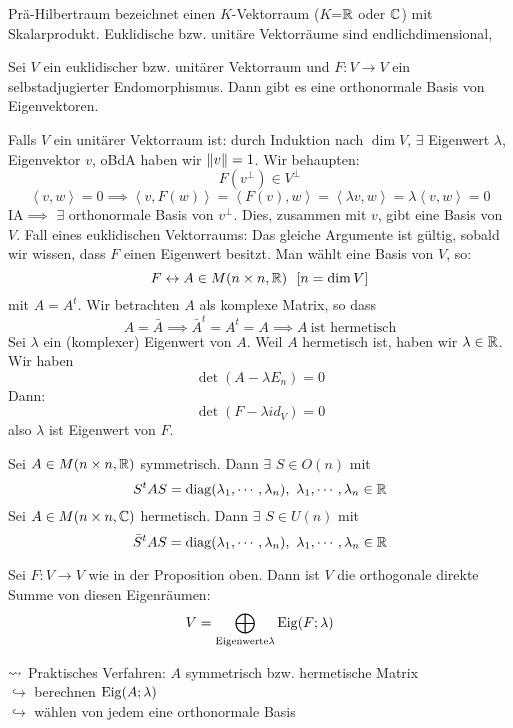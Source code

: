 \begin{Bem}{Prä-Hilbertraum}
  bezeichnet einen $K$-Vektorraum ($K$=$\mathbb{R}$ oder $\mathbb{C}$) mit Skalarprodukt. Euklidische bzw. unitäre Vektorräume sind endlichdimensional,
\end{Bem}
\begin{Prop}
  Sei $V$ ein euklidischer bzw. unitärer Vektorraum und $F:V\to V$ ein selbstadjugierter Endomorphismus. Dann gibt es eine orthonormale Basis von Eigenvektoren.
\end{Prop}
\begin{Bew}
  Falls $V$ ein unitärer Vektorraum ist: durch Induktion nach $\dim V$, $\exists$ Eigenwert $\lambda$, Eigenvektor $v$, oBdA haben wir $\left\| v \right\|=1$. Wir behaupten:
  \[F(v^\perp)\in V^\perp\]
  \[\left\langle v,w \right\rangle =0\implies \left\langle v,F(w) \right\rangle =\left\langle F(v),w \right\rangle =\left\langle \lambda v,w \right\rangle =\lambda\left\langle v,w \right\rangle =0\]
  IA$\implies$ $\exists$ orthonormale Basis von $v^\perp$. Dies, zusammen mit $v$, gibt eine Basis von $V$. Fall eines euklidischen Vektorraums: Das gleiche Argumente ist gültig, sobald wir wissen, dass $F$ einen Eigenwert besitzt. Man wählt eine Basis von $V$, so:
  \[F\lra A\in M(n\times n,\mb{R})\ \ [n=\dim V]\]
  mit $A=A^t$. Wir betrachten $A$ als komplexe Matrix, so dass 
  \[A=\bar A\implies \bar A^t=A^t=A \implies A\ \text{ist hermetisch}\]
  Sei $\lambda$ ein (komplexer) Eigenwert von $A$. Weil $A$ hermetisch ist, haben wir $\lambda\in \mathbb{R}$. Wir haben 
  \[\det(A-\lambda E_n)=0\]
  Dann:
  \[\det(F-\lambda id_V)=0\]
  also $\lambda$ ist Eigenwert von $F$.
\end{Bew}
\begin{Kor}
  Sei $A\in M(n\times n,\mathbb{R})$ symmetrisch. Dann $\exists$ $S\in O(n)$ mit
  \[S^tAS=\diag (\lambda_1,\cdots,\lambda_n),\ \lambda_1,\cdots,\lambda_n\in\mb{R}\]
  Sei $A\in M(n\times n,\mathbb{C})$ hermetisch. Dann $\exists$ $S\in U(n)$ mit
  \[\bar S^tAS=\diag (\lambda_1,\cdots,\lambda_n),\ \lambda_1,\cdots,\lambda_n\in\mb{R}\]
\end{Kor}
\begin{Kor}
  Sei $F:V\to V$ wie in der Proposition oben. Dann ist $V$ die orthogonale direkte Summe von diesen Eigenräumen:
  \[V=\bigoplus_{\text{Eigenwerte} \lambda}\operatorname{Eig}(F;\lambda)\]
\end{Kor}
\begin{Faz}
  $\rightsquigarrow$ Praktisches Verfahren: $A$ symmetrisch bzw. hermetische Matrix\\
  $\hookrightarrow$ berechnen $\operatorname{Eig}(A;\lambda)$\\
  $\hookrightarrow$ wählen von jedem eine orthonormale Basis
\end{Faz}
